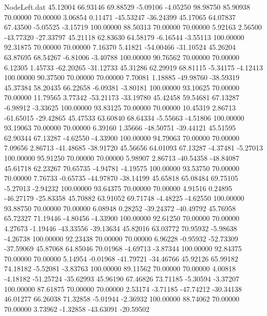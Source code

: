 \begin{filecontents}{NodeLeft.dat}
  45.12004   66.93146   69.88529    -5.09106   -4.05250   98.98750   85.90938   70.00000   70.00000    3.06854    0.11471  -45.53247  -36.24399
  45.17065   64.07837   67.43500    -5.05525   -3.15719  100.00000   88.50313   70.00000   70.00000    5.92163    2.56500  -43.77320  -27.33797
  45.21118   62.83630   64.58179    -6.16544   -3.55113  100.00000   92.31875   70.00000   70.00000    7.16370    5.41821  -54.00466  -31.10524
  45.26204   63.87695   68.54267    -6.81006   -3.40788  100.00000   90.76562   70.00000   70.00000    6.12305    1.45733  -62.20265  -31.12733
  45.31286   62.29919   68.81115    -5.34175   -4.12413  100.00000   90.37500   70.00000   70.00000    7.70081    1.18885  -49.98760  -38.59319
  45.37384   58.20435   66.22658    -6.09381   -3.80181  100.00000   93.10625   70.00000   70.00000   11.79565    3.77342  -53.21173  -33.19780
  45.42458   59.54681   67.13287    -6.98912   -3.33625  100.00000   93.83125   70.00000   70.00000   10.45319    2.86713  -61.65015  -29.42865
  45.47533   63.60840   68.64334    -5.55663   -4.51806  100.00000   93.19063   70.00000   70.00000    6.39160    1.35666  -48.50751  -39.44121
  45.51595   62.90344   67.13287    -4.62550   -4.33900  100.00000   94.79063   70.00000   70.00000    7.09656    2.86713  -41.48685  -38.91720
  45.56656   64.01093   67.13287    -4.37481   -5.27013  100.00000   95.91250   70.00000   70.00000    5.98907    2.86713  -40.54358  -48.84087
  45.61718   62.23267   70.65735    -4.94781   -4.19575  100.00000   93.53750   70.00000   70.00000    7.76733   -0.65735  -44.97870  -38.14199
  45.65818   65.08484   69.75105    -5.27013   -2.94232  100.00000   93.64375   70.00000   70.00000    4.91516    0.24895  -46.27179  -25.83358
  45.70882   63.91052   69.71748    -4.48225   -4.62550  100.00000   93.88750   70.00000   70.00000    6.08948    0.28252  -39.24372  -40.49792
  45.76958   65.72327   71.19446    -4.80456   -4.33900  100.00000   92.61250   70.00000   70.00000    4.27673   -1.19446  -43.33556  -39.13634
  45.82016   63.03772   70.95932    -5.98638   -4.26738  100.00000   92.23438   70.00000   70.00000    6.96228   -0.95932  -52.73309  -37.59069
  45.87068   64.85046   70.01968    -4.69713   -3.87344  100.00000   92.84375   70.00000   70.00000    5.14954   -0.01968  -41.79721  -34.46766
  45.92126   65.99182   74.18182    -5.52081   -3.83763  100.00000   89.11562   70.00000   70.00000    4.00818   -4.18182  -51.25724  -35.62993
  45.96190   67.46826   73.71185    -5.30594   -3.37207  100.00000   87.61875   70.00000   70.00000    2.53174   -3.71185  -47.74212  -30.34138
  46.01277   66.26038   71.32858    -5.01944   -2.36932  100.00000   88.74062   70.00000   70.00000    3.73962   -1.32858  -43.63091  -20.59502

\end{filecontents}
